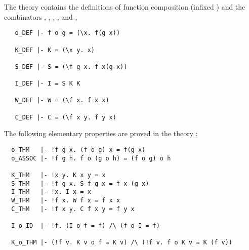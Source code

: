 The theory 
contains the definitions of function composition (infixed )
and the combinators
,
,
,
,
and ,

\begin{hol}
{\small
\begin{verbatim}
   o_DEF |- f o g = (\x. f(g x))

   K_DEF |- K = (\x y. x)

   S_DEF |- S = (\f g x. f x(g x))

   I_DEF |- I = S K K

   W_DEF |- W = (\f x. f x x)

   C_DEF |- C = (\f x y. f y x)
\end{verbatim}
}
\end{hol}

\noindent The following elementary properties are proved in the theory
:

\begin{hol}
\begin{verbatim}
  o_THM   |- !f g x. (f o g) x = f(g x)
  o_ASSOC |- !f g h. f o (g o h) = (f o g) o h

  K_THM   |- !x y. K x y = x
  S_THM   |- !f g x. S f g x = f x (g x)
  I_THM   |- !x. I x = x
  W_THM   |- !f x. W f x = f x x
  C_THM   |- !f x y. C f x y = f y x

  I_o_ID  |- !f. (I o f = f) /\ (f o I = f)

  K_o_THM |- (!f v. K v o f = K v) /\ (!f v. f o K v = K (f v))
\end{verbatim}
\end{hol}

